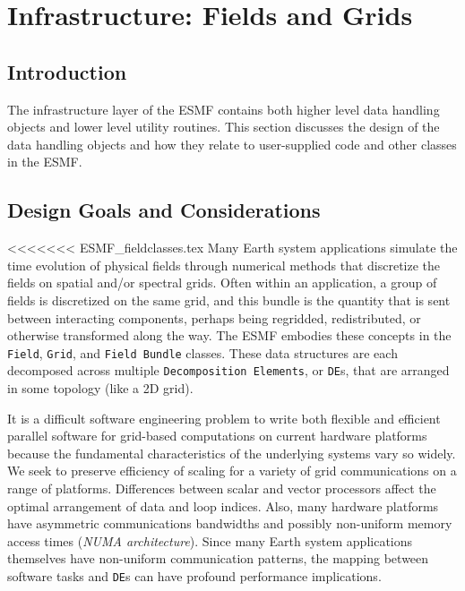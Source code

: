 \section{Infrastructure: Fields and Grids}
\label{sec:fieldclasses}

\subsection{Introduction}

The infrastructure layer of the ESMF contains both 
higher level data handling objects and lower level utility routines.
This section discusses the design of the data handling objects and 
how they relate to user-supplied code and other classes in the ESMF.  

\subsection{Design Goals and Considerations}

<<<<<<< ESMF_fieldclasses.tex
Many Earth system applications simulate the time evolution of physical 
fields through numerical methods that discretize the fields on spatial 
and/or spectral grids.  Often
within an application, a group of fields is discretized on the
same grid, and this bundle is the quantity that is sent between 
interacting components, perhaps being regridded, redistributed, or 
otherwise transformed along the way.  The ESMF embodies these concepts 
in the {\tt Field}, {\tt Grid}, and {\tt Field Bundle} classes.
These data structures are each decomposed across multiple {\tt Decomposition
Elements}, or {\tt DE}s, that are arranged in some topology (like a 2D grid).

It is a difficult software engineering problem to write both flexible 
and efficient parallel software for grid-based computations on current 
hardware platforms because the fundamental characteristics of the underlying
systems vary so widely.  We seek to preserve efficiency of scaling
for a variety of grid communications on a range of platforms.  
Differences between scalar and vector processors affect 
the optimal arrangement of data and loop indices.  Also, many hardware 
platforms have asymmetric communications bandwidths and possibly 
non-uniform memory access times ({\it NUMA architecture}).
Since many Earth system applications themselves have non-uniform 
communication patterns, the mapping between software tasks and 
{\tt DE}s can have profound performance implications.  

